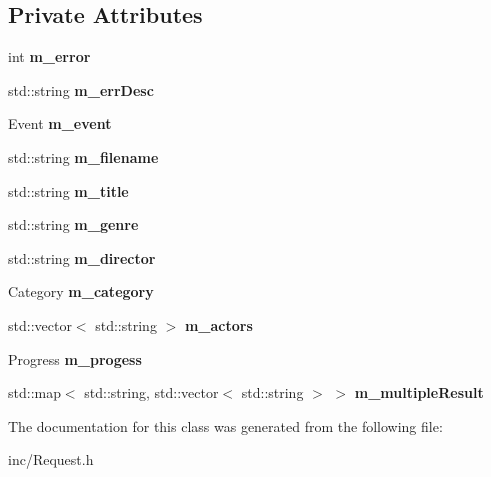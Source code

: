 \subsection*{Private Attributes}
\begin{DoxyCompactItemize}
\item 
\mbox{\label{classRequest_a800f47a6778e6e24ebd13d41b0e2ca60}} 
int {\bfseries m\+\_\+error}
\item 
\mbox{\label{classRequest_a212cbe676ab2e25d8a72f8fa90c8e995}} 
std\+::string {\bfseries m\+\_\+err\+Desc}
\item 
\mbox{\label{classRequest_a0bfb838b89c1023d9b57dc4df4733d6c}} 
Event {\bfseries m\+\_\+event}
\item 
\mbox{\label{classRequest_a40045cfce8fe9dc101c278ae7cf83516}} 
std\+::string {\bfseries m\+\_\+filename}
\item 
\mbox{\label{classRequest_a2516238c2da85c038b3915208092b978}} 
std\+::string {\bfseries m\+\_\+title}
\item 
\mbox{\label{classRequest_a293d96de516f3d17b7940685d7aa7032}} 
std\+::string {\bfseries m\+\_\+genre}
\item 
\mbox{\label{classRequest_af30966c666374e406f1e56353b1a054b}} 
std\+::string {\bfseries m\+\_\+director}
\item 
\mbox{\label{classRequest_a02bab296813ae4765db4bd9da9a0ccd3}} 
Category {\bfseries m\+\_\+category}
\item 
\mbox{\label{classRequest_a2548ab58e5681543ea138b4227fe1527}} 
std\+::vector$<$ std\+::string $>$ {\bfseries m\+\_\+actors}
\item 
\mbox{\label{classRequest_a22bbb26e70a9c676818840e13b5f3b4e}} 
Progress {\bfseries m\+\_\+progess}
\item 
\mbox{\label{classRequest_a5b77c9af6c08bd47874e2b6f791a820b}} 
std\+::map$<$ std\+::string, std\+::vector$<$ std\+::string $>$ $>$ {\bfseries m\+\_\+multiple\+Result}
\end{DoxyCompactItemize}


The documentation for this class was generated from the following file\+:\begin{DoxyCompactItemize}
\item 
inc/Request.\+h\end{DoxyCompactItemize}
